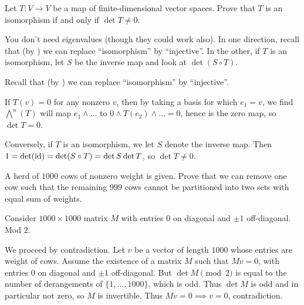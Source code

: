 \begin{problem}
	Let $T \colon V \to V$ be a map of finite-dimensional vector spaces.
	Prove that $T$ is an isomorphism
	if and only if $\det T \neq 0$.
	\begin{hint}
		You don't need eigenvalues (though they could work also).
		In one direction, recall that (by )
		we can replace ``isomorphism'' by ``injective''.
		In the other, if $T$ is an isomorphism,
		let $S$ be the inverse map and look at $\det(S \circ T)$.
	\end{hint}
	\begin{sol}
		Recall that (by \Cref{prob:equal_dimension})
		we can replace ``isomorphism'' by ``injective''.

		If $T(v) = 0$ for any nonzero $v$,
		then by taking a basis for which $e_1 = v$,
		we find $\bigwedge^n(T)$ will map $e_1 \wedge \dots$
		to $0 \wedge T(e_2) \wedge \dots = 0$,
		hence is the zero map, so $\det T = 0$.

		Conversely, if $T$ is an isomorphism,
		we let $S$ denote the inverse map.
		Then $1 = \det(\mathrm{id}) = \det(S \circ T) = \det S \det T$,
		so $\det T \neq 0$.
	\end{sol}
\end{problem}

\begin{problem}
	\onechili
	A herd of $1000$ cows of nonzero weight is given.
	Prove that we can remove one cow such that the remaining $999$ cows
	cannot be partitioned into two sets with equal sum of weights.
	\begin{hint}
		Consider $1000 \times 1000$ matrix $M$
		with entries $0$ on diagonal and $\pm 1$ off-diagonal.
		Mod $2$.
	\end{hint}
	\begin{sol}
		We proceed by contradiction.
		Let $v$ be a vector of length $1000$
		whose entries are weight of cows.
		Assume the existence of a matrix $M$ such that $Mv = 0$,
		with entries $0$ on diagonal and $\pm 1$ off-diagonal.
		But $\det M \pmod 2$ is equal to the number of derangements
		of $\{1, \dots, 1000\}$, which is odd.
		Thus $\det M$ is odd and in particular not zero,
		so $M$ is invertible.
		Thus $Mv = 0 \implies v = 0$, contradiction.
	\end{sol}
\end{problem}

